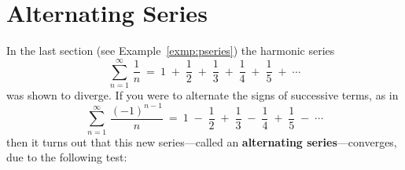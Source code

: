\section{Alternating Series}\label{sec:alternating-series}
In the last section (see Example~\ref{exmp:pseries}) the harmonic series
\[
\sum_{n=1}^{\infty} \,\frac{1}{n} ~=~ 1 \;+\; \frac{1}{2} \;+\; \frac{1}{3}
\;+\; \frac{1}{4} \;+\; \frac{1}{5} \;+\; \cdots
\]
was shown to diverge. If you were to alternate the signs of successive terms, as
in
\begin{equation}\label{eqn:altharmonic}
\sum_{n=1}^{\infty} \,\frac{(-1)^{n-1}}{n} ~=~ 1 \;-\; \frac{1}{2} \;+\; \frac{1}{3}
\;-\; \frac{1}{4} \;+\; \frac{1}{5} \;-\; \cdots
\end{equation}
then it turns out that this new series---called an
\textbf{alternating series}---converges, due to the
following test:


